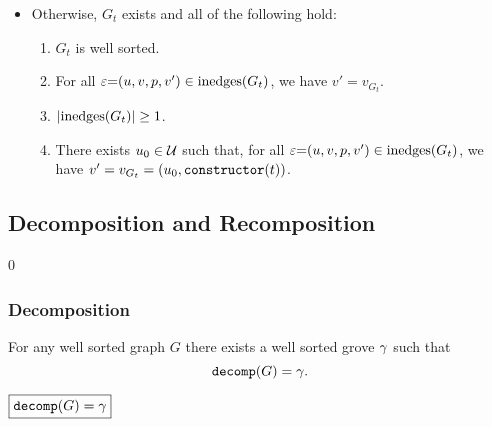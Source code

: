 \begin{definition}
\begin{itemize}
    \item Otherwise, $G_t$ exists and all of the following hold:
      \begin{enumerate}
        \item $G_t$ is well sorted.
        \item For all $\varepsilon{=}(u, v, p, v') \in \text{inedges}\mathopen{}\left(G_t\right)\mathclose{}$,
          we have $v' = v_{G_t}$.
        \item $\left\lvert\text{inedges}\mathopen{}\left(G_t\right)\mathclose{}\right\rvert \geq 1$.
        \item There exists $u_0 \in \mathcal{U}$ such that,
          for all $\varepsilon{=}(u, v, p, v') \in \text{inedges}\mathopen{}\left(G_t\right)\mathclose{}$,
          we have $v' = v_{G_t} = (u_0, \operatorname{\texttt{constructor}}\mathopen{}\left(t\right)\mathclose{})$.
      \end{enumerate}
  \end{itemize}
\end{definition}



\subsection{Decomposition and Recomposition}

\figureDecompositionDefHelpersContent

0%

\subsubsection{Decomposition}

\begin{theorem}
  For any well sorted graph $G$
  there exists a well sorted grove $\gamma$
  such that \[\operatorname{\texttt{decomp}}\mathopen{}\left(G\right)\mathclose{} = \gamma.\]
\end{theorem}


\noindent $\boxed{\operatorname{\texttt{decomp}}\mathopen{}\left(G\right)\mathclose{} = \gamma}$
%
\figureDecompositionDefDecomp

